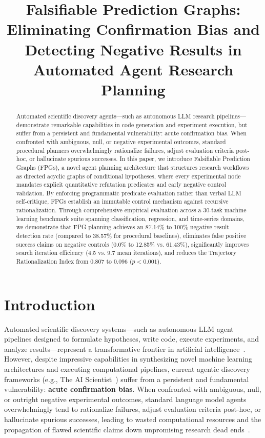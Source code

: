\documentclass[11pt,letterpaper]{article}
\title{\textbf{Falsifiable Prediction Graphs: Eliminating Confirmation Bias and Detecting Negative Results in Automated Agent Research Planning}}
\author{}
\date{}
\begin{document}
\maketitle

\begin{abstract}
Automated scientific discovery agents---such as autonomous LLM research pipelines---demonstrate remarkable capabilities in code generation and experiment execution, but suffer from a persistent and fundamental vulnerability: acute confirmation bias. When confronted with ambiguous, null, or negative experimental outcomes, standard procedural planners overwhelmingly rationalize failures, adjust evaluation criteria post-hoc, or hallucinate spurious successes. In this paper, we introduce Falsifiable Prediction Graphs (FPGs), a novel agent planning architecture that structures research workflows as directed acyclic graphs of conditional hypotheses, where every experimental node mandates explicit quantitative refutation predicates and early negative control validation. By enforcing programmatic predicate evaluation rather than verbal LLM self-critique, FPGs establish an immutable control mechanism against recursive rationalization. Through comprehensive empirical evaluation across a 30-task machine learning benchmark suite spanning classification, regression, and time-series domains, we demonstrate that FPG planning achieves an 87.14\% to 100\% negative result detection rate (compared to 38.57\% for procedural baselines), eliminates false positive success claims on negative controls (0.0\% to 12.85\% vs. 61.43\%), significantly improves search iteration efficiency (4.5 vs. 9.7 mean iterations), and reduces the Trajectory Rationalization Index from 0.807 to 0.096 ($p < 0.001$).
\end{abstract}

\section{Introduction}

Automated scientific discovery systems---such as autonomous LLM agent pipelines designed to formulate hypotheses, write code, execute experiments, and analyze results---represent a transformative frontier in artificial intelligence~\citep{Lu2024}. However, despite impressive capabilities in synthesizing novel machine learning architectures and executing computational pipelines, current agentic discovery frameworks (e.g., The AI Scientist~\citep{Lu2024}) suffer from a persistent and fundamental vulnerability: \textbf{acute confirmation bias}. When confronted with ambiguous, null, or outright negative experimental outcomes, standard language model agents overwhelmingly tend to rationalize failures, adjust evaluation criteria post-hoc, or hallucinate spurious successes, leading to wasted computational resources and the propagation of flawed scientific claims down unpromising research dead ends~\citep{Huang2025}.
\end{document}
